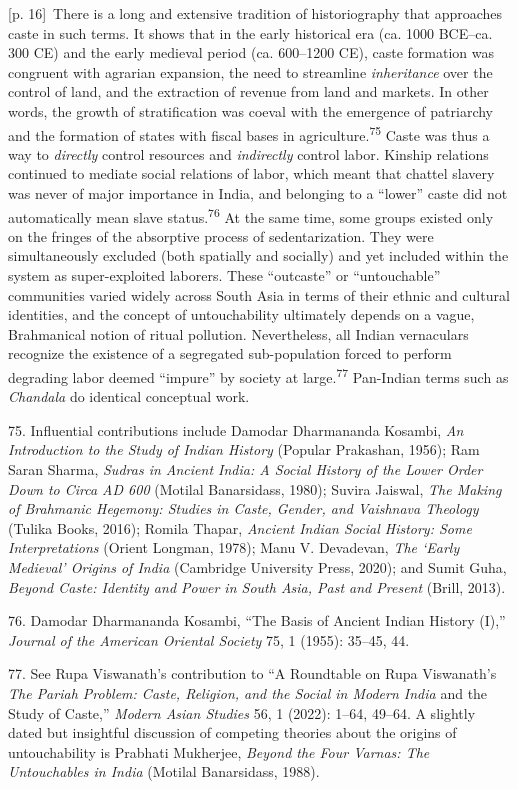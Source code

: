 \documentclass[10pt,a4paper]{article}
\begin{document}
{\scriptsize\color{gray} [p. 16]}\ There is a long and extensive tradition of historiography that approaches caste in such terms. It shows that in the early historical era (ca. 1000 BCE–ca. 300 CE) and the early medieval period (ca. 600–1200 CE), caste formation was congruent with agrarian expansion, the need to streamline \textit{inheritance} over the control of land, and the extraction of revenue from land and markets. In other words, the growth of stratification was coeval with the emergence of patriarchy and the formation of states with fiscal bases in agriculture.\nobreak\textsuperscript{75} Caste was thus a way to \textit{directly} control resources and \textit{indirectly} control labor. Kinship relations continued to mediate social relations of labor, which meant that chattel slavery was never of major importance in India, and belonging to a “lower” caste did not automatically mean slave status.\nobreak\textsuperscript{76} At the same time, some groups existed only on the fringes of the absorptive process of sedentarization. They were simultaneously excluded (both spatially and socially) and yet included within the system as super-exploited laborers. These “outcaste” or “untouchable” communities varied widely across South Asia in terms of their ethnic and cultural identities, and the concept of untouchability ultimately depends on a vague, Brahmanical notion of ritual pollution. Nevertheless, all Indian vernaculars recognize the existence of a segregated sub-population forced to perform degrading labor deemed “impure” by society at large.\nobreak\textsuperscript{77} Pan-Indian terms such as \textit{Chandala} do identical conceptual work.\par{\small 75. Influential contributions include Damodar Dharmananda Kosambi, \textit{An Introduction to the Study of Indian History} (Popular Prakashan, 1956); Ram Saran Sharma, \textit{Sudras in Ancient India: A Social History of the Lower Order Down to Circa AD 600} (Motilal Banarsidass, 1980); Suvira Jaiswal, \textit{The Making of Brahmanic Hegemony: Studies in Caste, Gender, and Vaishnava Theology} (Tulika Books, 2016); Romila Thapar, \textit{Ancient Indian Social History: Some Interpretations} (Orient Longman, 1978); Manu V. Devadevan, \textit{The ‘Early Medieval’ Origins of India} (Cambridge University Press, 2020); and Sumit Guha, \textit{Beyond Caste: Identity and Power in South Asia, Past and Present} (Brill, 2013).\par}{\small 76. Damodar Dharmananda Kosambi, “The Basis of Ancient Indian History (I),” \textit{Journal of the American Oriental Society} 75, 1 (1955): 35–45, 44.\par}{\small 77. See Rupa Viswanath’s contribution to “A Roundtable on Rupa Viswanath’s \textit{The Pariah Problem: Caste, Religion, and the Social in Modern India} and the Study of Caste,” \textit{Modern Asian Studies} 56, 1 (2022): 1–64, 49–64. A slightly dated but insightful discussion of competing theories about the origins of untouchability is Prabhati Mukherjee, \textit{Beyond the Four Varnas: The Untouchables in India} (Motilal Banarsidass, 1988).\par}
\end{document}
